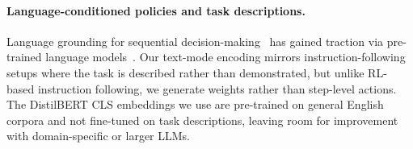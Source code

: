 \paragraph{Language-conditioned policies and task descriptions.}
Language grounding for sequential decision-making~\cite{luketina2019survey} has gained traction via pre-trained language models~\cite{devlin2018bert,liu2019roberta}.
Our text-mode encoding mirrors instruction-following setups where the task is described rather than demonstrated, but unlike RL-based instruction following, we generate weights rather than step-level actions.
The DistilBERT CLS embeddings we use are pre-trained on general English corpora and not fine-tuned on task descriptions, leaving room for improvement with domain-specific or larger LLMs.
